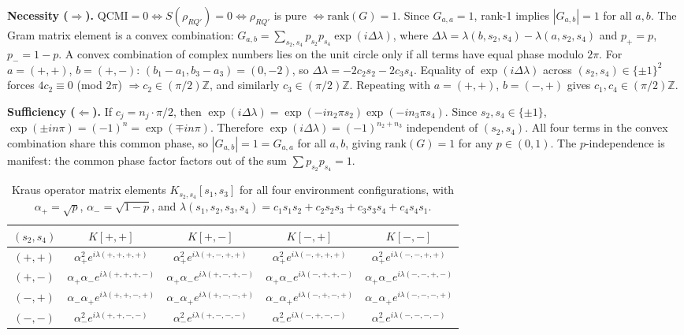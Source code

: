 \documentclass[aps,prl,superscriptaddress,nofootinbib]{revtex4-2}
\begin{document}
\textbf{Necessity ($\Rightarrow$).} $\text{QCMI} = 0 \Leftrightarrow S(\rho_{RQ'}) = 0 \Leftrightarrow \rho_{RQ'}$ is pure $\Leftrightarrow \text{rank}(G) = 1$. Since $G_{a,a} = 1$, rank-1 implies $|G_{a,b}| = 1$ for all $a,b$. The Gram matrix element is a convex combination: $G_{a,b} = \sum_{s_2,s_4} p_{s_2}p_{s_4} \exp(i\Delta\lambda)$, where $\Delta\lambda = \lambda(b,s_2,s_4) - \lambda(a,s_2,s_4)$ and $p_+ = p$, $p_- = 1-p$. A convex combination of complex numbers lies on the unit circle only if all terms have equal phase modulo $2\pi$. For $a = (+,+)$, $b = (+,-)$: $(b_1-a_1, b_3-a_3) = (0,-2)$, so $\Delta\lambda = -2c_2 s_2 - 2c_3 s_4$. Equality of $\exp(i\Delta\lambda)$ across $(s_2,s_4) \in \{\pm1\}^2$ forces $4c_2\equiv 0$ (mod $2\pi$) $\Rightarrow c_2\in (\pi/2)\mathbb{Z}$, and similarly $c_3\in (\pi/2)\mathbb{Z}$. Repeating with $a = (+,+)$, $b = (-,+)$ gives $c_1, c_4\in (\pi/2)\mathbb{Z}$.

\textbf{Sufficiency ($\Leftarrow$).} If $c_j = n_j\cdot\pi/2$, then $\exp(i\Delta\lambda) = \exp(-i n_2\pi s_2) \exp(-i n_3\pi s_4)$. Since $s_2,s_4\in \{\pm1\}$, $\exp(\pm i n\pi) = (-1)^n = \exp(\mp i n\pi)$. Therefore $\exp(i\Delta\lambda) = (-1)^{n_2+n_3}$ independent of $(s_2,s_4)$. All four terms in the convex combination share this common phase, so $|G_{a,b}| = 1 = G_{a,a}$ for all $a,b$, giving $\text{rank}(G) = 1$ for any $p \in (0,1)$. The $p$-independence is manifest: the common phase factor factors out of the sum $\sum p_{s_2}p_{s_4} = 1$.

\begin{table}[h]
\caption{Kraus operator matrix elements $K_{s_2,s_4}[s_1,s_3]$ for all four environment configurations, with $\alpha_+=\sqrt{p}$, $\alpha_-=\sqrt{1-p}$, and $\lambda(s_1,s_2,s_3,s_4)=c_1 s_1 s_2+c_2 s_2 s_3+c_3 s_3 s_4+c_4 s_4 s_1$.}
\label{tab:kraus}
\begin{ruledtabular}
\begin{tabular}{ccccc}
$(s_2,s_4)$ & $K[+,+]$ & $K[+,-]$ & $K[-,+]$ & $K[-,-]$ \\
\hline
$(+,+)$ & $\alpha_+^2 e^{i\lambda(+,+,+,+)}$ & $\alpha_+^2 e^{i\lambda(+,-,+,+)}$ & $\alpha_+^2 e^{i\lambda(-,+,+,+)}$ & $\alpha_+^2 e^{i\lambda(-,-,+,+)}$ \\
$(+,-)$ & $\alpha_+\alpha_- e^{i\lambda(+,+,+,-)}$ & $\alpha_+\alpha_- e^{i\lambda(+,-,+,-)}$ & $\alpha_+\alpha_- e^{i\lambda(-,+,+,-)}$ & $\alpha_+\alpha_- e^{i\lambda(-,-,+,-)}$ \\
$(-,+)$ & $\alpha_-\alpha_+ e^{i\lambda(+,+,-,+)}$ & $\alpha_-\alpha_+ e^{i\lambda(+,-,-,+)}$ & $\alpha_-\alpha_+ e^{i\lambda(-,+,-,+)}$ & $\alpha_-\alpha_+ e^{i\lambda(-,-,-,+)}$ \\
$(-,-)$ & $\alpha_-^2 e^{i\lambda(+,+,-,-)}$ & $\alpha_-^2 e^{i\lambda(+,-,-,-)}$ & $\alpha_-^2 e^{i\lambda(-,+,-,-)}$ & $\alpha_-^2 e^{i\lambda(-,-,-,-)}$ \\
\end{tabular}
\end{ruledtabular}
\end{table}
\end{document}
